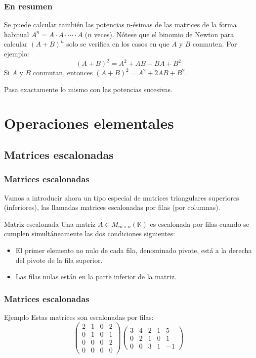 \documentclass[12pt]{article}
\begin{document}
\begin{frame}
\frametitle{En resumen}
   
   Se puede calcular tambi\'en las potencias n-\'esimas de las matrices de la forma habitual $A^n = A\cdot A\cdot \cdots \cdot A$ ($n$ veces). N\'otese que el binomio de Newton para calcular $(A+B)^n$ solo se verifica en los casos en que $A$ y $B$ conmuten. Por ejemplo:
   \[(A+B)^2 = A^2+AB+BA+B^2\] 
Si $A$ y $B$ conmutan, entonces $(A+B)^2 = A^2+2AB+B^2$.

Pasa exactamente lo mismo con las potencias sucesivas.
 \end{frame} 
 
\section{Operaciones elementales}
\subsection{Matrices escalonadas}

 \begin{frame}
  \frametitle{Matrices escalonadas}
Vamos a introducir ahora un tipo especial de matrices triangulares superiores (inferiores), las llamadas matrices escalonadas por filas (por columnas).

 \begin{block}{Matriz escalonada}
Una matriz $A\in M_{m\times n}(\mathbb{K})$ es escalonada por filas cuando se cumplen simult\'aneamente las dos condiciones siguientes:
\begin{itemize}
\item El primer elemento no nulo de cada fila, denominado pivote, est\'a a la derecha del pivote de la fila superior.
\item Las filas nulas est\'an en la parte inferior de la matriz.
\end{itemize}
\end{block}
\end{frame} 
 

 \begin{frame}
  \frametitle{Matrices escalonadas}

 \begin{block}{Ejemplo}
Estas matrices son escalonadas por filas:
\[ \left(\begin{array}{cccc}2 & 1 & 0 & 2 \\0 & 1 & 0 & 1 \\0 & 0 & 0 & 2 \\0 & 0 & 0 & 0\end{array}\right)
\left(\begin{array}{ccccc}3 & 4 & 2 & 1 & 5 \\0 & 2 & 1 & 0 & 1 \\0 & 0 & 3 & 1 & -1\end{array}\right)
\]
\end{block}
\end{frame} 
\end{document}
